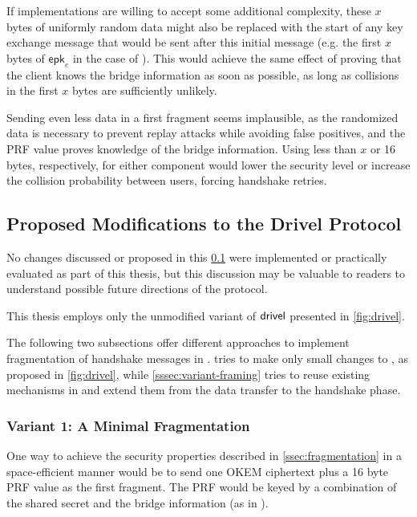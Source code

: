 If implementations are willing to accept some additional complexity, these $x$ bytes of uniformly random data might also be replaced with the start of any key exchange message that would be sent after this initial message (e.g. the first $x$ bytes of $\mathsf{epk}_e$ in the case of \drivel{}). This would achieve the same effect of proving that the client knows the bridge information as soon as possible, as long as collisions in the first $x$ bytes are sufficiently unlikely.

Sending even less data in a first fragment seems implausible, as the randomized data is necessary to prevent replay attacks while avoiding false positives, and the PRF value proves knowledge of the bridge information. Using less than $x$ or 16 bytes, respectively, for either component would lower the security level or increase the collision probability between users, forcing handshake retries.

\subsection{Proposed Modifications to the Drivel Protocol} \label{ssec:drivel-mod}

No changes discussed or proposed in this \cref{ssec:drivel-mod} were implemented or practically evaluated as part of this thesis, but this discussion may be valuable to readers to understand possible future directions of the protocol.

This thesis employs only the unmodified variant of $\textsf{drivel}{}$ presented in \cref{fig:drivel}.

The following two subsections offer different approaches to implement fragmentation of handshake messages in \drivel{}.  tries to make only small changes to \drivel{}, as proposed in \cref{fig:drivel}, while \cref{sssec:variant-framing} tries to reuse existing mechanisms in \obfsfour{} and extend them from the data transfer to the handshake phase.

\subsubsection{Variant 1: A Minimal Fragmentation} \label{sssec:variant-minimal}

One way to achieve the security properties described in \cref{ssec:fragmentation} in a space-efficient manner would be to send one OKEM ciphertext plus a 16 byte PRF value as the first fragment. The PRF would be keyed by a combination of the shared secret and the bridge information (as in \drivel{}).

